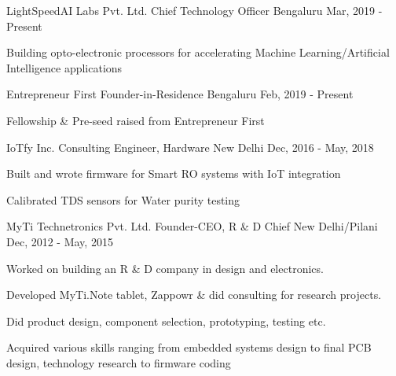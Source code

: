 

\begin{cventries}

\cventry
{LightSpeedAI Labs Pvt. Ltd.} %
{Chief Technology Officer} %
{Bengaluru} %
{Mar, 2019 - Present} %
{
	\begin{cvitems} %
		\item {Building opto-electronic processors for accelerating Machine Learning/Artificial Intelligence applications}
	\end{cvitems}
}

\cventry
{Entrepreneur First} %
{Founder-in-Residence} %
{Bengaluru} %
{Feb, 2019 - Present} %
{
	\begin{cvitems} %
		\item {Fellowship \& Pre-seed raised from Entrepreneur First}
	\end{cvitems}
}

\cventry
{IoTfy Inc.} %
{Consulting Engineer, Hardware} %
{New Delhi} %
{Dec, 2016 - May, 2018} %
{
	\begin{cvitems} %
		\item {Built and wrote firmware for Smart RO systems with IoT integration}
		\item {Calibrated TDS sensors for Water purity testing}
	\end{cvitems}
}

  \cventry
    {MyTi Technetronics Pvt. Ltd.} %
    {Founder-CEO, R \& D Chief} %
    {New Delhi/Pilani} %
    {Dec, 2012 - May, 2015} %
    {
      \begin{cvitems} %
        \item {Worked on building an R \& D company in design and electronics.}
        \item {Developed MyTi.Note tablet, Zappowr \& did consulting for research projects.}
        \item {Did product design, component selection, prototyping, testing etc.}
        \item {Acquired various skills ranging from embedded systems design to final PCB design, technology research to firmware coding}
      \end{cvitems}
    }


\end{cventries}
